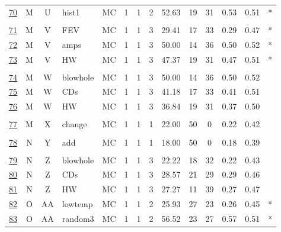 \documentclass[12pt,english,nohyper]{tufte-handout}\usepackage[]{graphicx}\usepackage[]{color}
\begin{document}
\begin{longtable}{cccl|cccc|ccccc|l}
  \hyperlink{T03.M.U.02.1.1.MC.hist1.2}{70} & M & U & hist1 & MC &   1 &   1 &   2 & 52.63 &  19 &  31 & 0.53 & 0.51 & * \\ 
   &  &  &  &  &  &  &  &  &  &  &  &  &  \\ 
  \hyperlink{T03.M.V.03.1.1.MC.FEV.2}{71} & M & V & FEV & MC &   1 &   1 &   3 & 29.41 &  17 &  33 & 0.29 & 0.47 & * \\ 
  \hyperlink{T03.M.V.03.1.1.MC.amps.2}{72} & M & V & amps & MC &   1 &   1 &   3 & 50.00 &  14 &  36 & 0.50 & 0.52 & * \\ 
  \hyperlink{T03.M.V.03.1.1.MC.HW.2}{73} & M & V & HW & MC &   1 &   1 &   3 & 47.37 &  19 &  31 & 0.47 & 0.51 & * \\ 
   &  &  &  &  &  &  &  &  &  &  &  &  &  \\ 
  \hyperlink{T03.M.W.03.1.1.MC.blowhole.2}{74} & M & W & blowhole & MC &   1 &   1 &   3 & 50.00 &  14 &  36 & 0.50 & 0.52 &  \\ 
  \hyperlink{T03.M.W.03.1.1.MC.CDs.2}{75} & M & W & CDs & MC &   1 &   1 &   3 & 41.18 &  17 &  33 & 0.41 & 0.51 &  \\ 
  \hyperlink{T03.M.W.03.1.1.MC.HW.2}{76} & M & W & HW & MC &   1 &   1 &   3 & 36.84 &  19 &  31 & 0.37 & 0.50 &  \\ 
   &  &  &  &  &  &  &  &  &  &  &  &  &  \\ 
  \hyperlink{T03.M.X.01.1.1.MC.change.2}{77} & M & X & change & MC &   1 &   1 &   1 & 22.00 &  50 &   0 & 0.22 & 0.42 &  \\ 
   &  &  &  &  &  &  &  &  &  &  &  &  &  \\ 
  \hyperlink{T03.N.Y.01.1.1.MC.add.2}{78} & N & Y & add & MC &   1 &   1 &   1 & 18.00 &  50 &   0 & 0.18 & 0.39 &  \\ 
   &  &  &  &  &  &  &  &  &  &  &  &  &  \\ 
  \hyperlink{T03.N.Z.03.1.1.MC.blowhole.2}{79} & N & Z & blowhole & MC &   1 &   1 &   3 & 22.22 &  18 &  32 & 0.22 & 0.43 &  \\ 
  \hyperlink{T03.N.Z.03.1.1.MC.CDs.2}{80} & N & Z & CDs & MC &   1 &   1 &   3 & 28.57 &  21 &  29 & 0.29 & 0.46 &  \\ 
  \hyperlink{T03.N.Z.03.1.1.MC.HW.2}{81} & N & Z & HW & MC &   1 &   1 &   3 & 27.27 &  11 &  39 & 0.27 & 0.47 &  \\ 
  \hyperlink{T03.O.AA.02.1.1.MC.lowtemp.2}{82} & O & AA & lowtemp & MC &   1 &   1 &   2 & 25.93 &  27 &  23 & 0.26 & 0.45 & * \\ 
  \hyperlink{T03.O.AA.02.1.1.MC.random3.2}{83} & O & AA & random3 & MC &   1 &   1 &   2 & 56.52 &  23 &  27 & 0.57 & 0.51 & * \\ 

\end{longtable}
\end{document}
